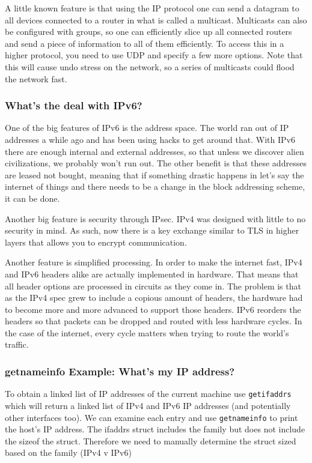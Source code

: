 \documentclass[]{article}
\begin{document}
A little known feature is that using the IP protocol one can send a
datagram to all devices connected to a router in what is called a
multicast. Multicasts can also be configured with groups, so one can
efficiently slice up all connected routers and send a piece of
information to all of them efficiently. To access this in a higher
protocol, you need to use UDP and specify a few more options. Note that
this will cause undo stress on the network, so a series of multicasts
could flood the network fast.

\subsubsection{What's the deal with
IPv6?}\label{whats-the-deal-with-ipv6}

One of the big features of IPv6 is the address space. The world ran out
of IP addresses a while ago and has been using hacks to get around that.
With IPv6 there are enough internal and external addresses, so that
unless we discover alien civilizations, we probably won't run out. The
other benefit is that these addresses are leased not bought, meaning
that if something drastic happens in let's say the internet of things
and there needs to be a change in the block addressing scheme, it can be
done.

Another big feature is security through IPsec. IPv4 was designed with
little to no security in mind. As such, now there is a key exchange
similar to TLS in higher layers that allows you to encrypt
communication.

Another feature is simplified processing. In order to make the internet
fast, IPv4 and IPv6 headers alike are actually implemented in hardware.
That means that all header options are processed in circuits as they
come in. The problem is that as the IPv4 spec grew to include a copious
amount of headers, the hardware had to become more and more advanced to
support those headers. IPv6 reorders the headers so that packets can be
dropped and routed with less hardware cycles. In the case of the
internet, every cycle matters when trying to route the world's traffic.

\subsubsection{getnameinfo Example: What's my IP
address?}\label{getnameinfo-example-whats-my-ip-address}

To obtain a linked list of IP addresses of the current machine use
\texttt{getifaddrs} which will return a linked list of IPv4 and IPv6 IP
addresses (and potentially other interfaces too). We can examine each
entry and use \texttt{getnameinfo} to print the host's IP address. The
ifaddrs struct includes the family but does not include the sizeof the
struct. Therefore we need to manually determine the struct sized based
on the family (IPv4 v IPv6)
\end{document}
